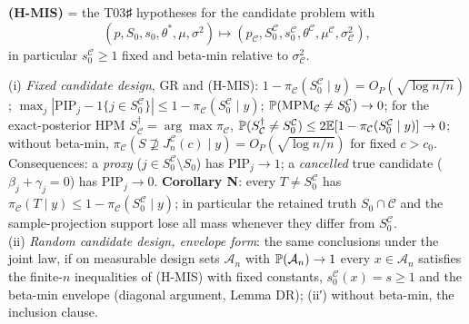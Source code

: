 \textbf{(H-MIS)} = the T03♯ hypotheses for the candidate problem with \[(p,S_0,s_0,\theta^*,\mu,\sigma^2)\mapsto(p_{\mathcal C},S_0^{\mathcal C},s_0^{\mathcal C},\theta^{\mathcal C},\mu^{\mathcal C},\sigma^2_{\mathcal C}),\] in particular $s_0^{\mathcal C}\ge1$ fixed and beta-min relative to $\sigma^2_{\mathcal C}$.

\begin{theorem}[MIS]\label{thm:MIS}
(i) \emph{Fixed candidate design}, GR and (H-MIS): $1-\pi_{\mathcal C}(S_0^{\mathcal C}\mid y)=O_P(\sqrt{\log n/n})$; $\max_j|\mathrm{PIP}_j-1\{j\in S_0^{\mathcal C}\}|\le1-\pi_{\mathcal C}(S_0^{\mathcal C}\mid y)$; $\mathbb P(\mathrm{MPM}_{\mathcal C}\ne S_0^{\mathcal C})\to0$; for the exact-posterior HPM $S^\dagger_{\mathcal C}=\arg\max\pi_{\mathcal C}$, $\mathbb P(S^\dagger_{\mathcal C}\ne S_0^{\mathcal C})\le2\mathbb E[1-\pi_{\mathcal C}(S_0^{\mathcal C}\mid y)]\to0$; without beta-min, $\pi_{\mathcal C}(S\not\supseteq J_n^{\mathcal C}(c)\mid y)=O_P(\sqrt{\log n/n})$ for fixed $c>c_0$. Consequences: a \emph{proxy} ($j\in S_0^{\mathcal C}\setminus S_0$) has $\mathrm{PIP}_j\to1$; a \emph{cancelled} true candidate ($\beta_j+\gamma_j=0$) has $\mathrm{PIP}_j\to0$. \textbf{Corollary N}: every $T\ne S_0^{\mathcal C}$ has $\pi_{\mathcal C}(T\mid y)\le1-\pi_{\mathcal C}(S_0^{\mathcal C}\mid y)$; in particular the retained truth $S_0\cap\mathcal C$ and the sample-projection support lose all mass whenever they differ from $S_0^{\mathcal C}$.\\
(ii) \emph{Random candidate design, envelope form}: the same conclusions under the joint law, if on measurable design sets $\mathcal A_n$ with $\mathbb P(\mathcal A_n)\to1$ every $x\in\mathcal A_n$ satisfies the finite-$n$ inequalities of (H-MIS) with fixed constants, $s_0^{\mathcal C}(x)=s\ge1$ and the beta-min envelope (diagonal argument, Lemma DR); (ii′) without beta-min, the inclusion clause.\\

\end{theorem}

